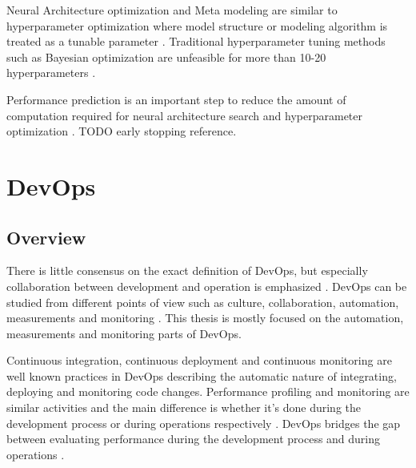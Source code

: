 Neural Architecture optimization and Meta modeling are similar to hyperparameter optimization where model structure or modeling algorithm is treated as a tunable parameter \parencite{bakerAcceleratingNeuralArchitecture2017}. Traditional hyperparameter tuning methods such as Bayesian optimization are unfeasible for more than 10-20 hyperparameters \parencite{maclaurinGradientbasedHyperparameterOptimization2015}.

Performance prediction is an important step to reduce the amount of computation required for neural architecture search and hyperparameter optimization \parencite{bakerAcceleratingNeuralArchitecture2017}. TODO early stopping reference.



\section{DevOps}
\label{sec:devops}

\subsection{Overview}

There is little consensus on the exact definition of DevOps, but especially collaboration between development and operation is emphasized \parencite{mishraDevOpsSoftwareQuality2020,wallerIncludingPerformanceBenchmarks2015}. DevOps can be studied from different points of view such as culture, collaboration, automation, measurements and monitoring \parencite{mishraDevOpsSoftwareQuality2020, wallerIncludingPerformanceBenchmarks2015}. This thesis is mostly focused on the automation, measurements and monitoring parts of DevOps.

Continuous integration, continuous deployment and continuous monitoring are well known practices in DevOps \parencite{wallerIncludingPerformanceBenchmarks2015} describing the automatic nature of integrating, deploying and monitoring code changes. Performance profiling and monitoring are similar activities and the main difference is whether it's done during the development process or during operations respectively \parencite{wallerIncludingPerformanceBenchmarks2015}. DevOps bridges the gap between evaluating performance during the development process and during operations \parencite{brunnertPerformanceorientedDevOpsResearch2015}.

